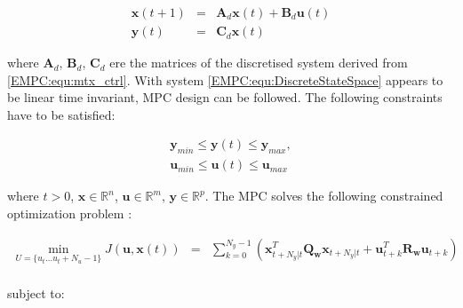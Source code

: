     \begin{equation}
        \begin{array}{rcl}
            \boldsymbol{x}(t+1)&=&\boldsymbol{A}_d\boldsymbol{x}(t)+\boldsymbol{B}_d\boldsymbol{u}(t)\\
            \boldsymbol{y}(t)&=&\boldsymbol{C}_d\boldsymbol{x}(t)
        \end{array}
        \label{EMPC:equ:DiscreteStateSpace}
    \end{equation}

    where $\textbf{A}_d$, $\textbf{B}_d$, $\textbf{C}_d$ ere the matrices of the discretised system derived from \ref{EMPC:equ:mtx_ctrl}. With system \ref{EMPC:equ:DiscreteStateSpace} appears to be linear time invariant, MPC design can be followed. The following constraints have to be satisfied:

    \begin{equation}
        \begin{array}{r}
            \boldsymbol{y}_{min}\leq\boldsymbol{y}(t)\leq\boldsymbol{y}_{max},\\
            \boldsymbol{u}_{min}\leq\boldsymbol{u}(t)\leq\boldsymbol{u}_{max}
        \end{array}
        \label{EMPC:equ:contraint_desc}
    \end{equation}

    where $t>0$, $\textbf{x}\in \mathbb{R}^n$, $\textbf{u}\in \mathbb{R}^m$, $\textbf{y}\in \mathbb{R}^p$. The MPC solves the following constrained optimization problem \cite{rivera2013predictive}:

    \begin{equation}
        \begin{array}{rcl}
           \displaystyle \min_{U=\{u_t\dots u_t+N_u-1\}}J(\boldsymbol{u},\boldsymbol{x}(t))&=&\sum^{N_y-1}_{k=0}(\boldsymbol{x}^T_{t+N_y|t}\boldsymbol{Q_w}\boldsymbol{x}_{t+N_y|t}+
           \boldsymbol{u}^T_{t+k}\boldsymbol{R_w}\boldsymbol{u}_{t+k})\\
        \end{array}
        \label{EMPC:equ:optim_problem}
    \end{equation}

    subject to:


